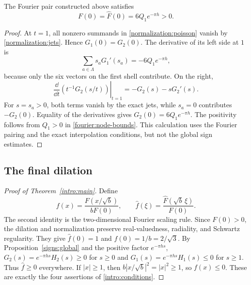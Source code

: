 \begin{lemma}\label{normalization:origin-lemma}
The Fourier pair constructed above satisfies
\begin{equation}\label{normalization:origin}
 F(0)=\widehat F(0)=6Q_1e^{-\pi h}>0.
\end{equation}
\end{lemma}

\begin{proof}
At $t=1$, all nonzero summands in \eqref{normalization:poisson} vanish by
\eqref{normalization:jets}.  Hence $G_1(0)=G_2(0)$.
The derivative of its left side at $1$ is
\[
 \sum_{a\in\Lambda}s_aG_1'(s_a)=-6Q_1e^{-\pi h},
\]
because only the six vectors on the first shell contribute.  On the right,
\[
 \left.\frac{\dd}{\dd t}\left(t^{-1}G_2(s/t)\right)\right|_{t=1}
 =-G_2(s)-sG_2'(s).
\]
For $s=s_a>0$, both terms vanish by the exact jets, while $s_a=0$ contributes
$-G_2(0)$.  Equality of the derivatives gives
$G_2(0)=6Q_1e^{-\pi h}$.  The positivity follows from $Q_1>0$ in
\eqref{fourier:node-bounds}.  This calculation uses the Fourier pairing and
the exact interpolation conditions, but not the global sign estimates.
\end{proof}

\subsection{The final dilation}

\begin{proof}[Proof of Theorem~\ref{intro:main}]
Define
\begin{equation}\label{normalization:scaling}
 f(x)=\frac{F(x/\sqrt b)}{bF(0)},\qquad
 \widehat f(\xi)=\frac{\widehat F(\sqrt b\,\xi)}{F(0)}.
\end{equation}
The second identity is the two-dimensional Fourier scaling rule.  Since
$F(0)>0$, the dilation and normalization preserve real-valuedness,
radiality, and Schwartz regularity.  They give
$\widehat f(0)=1$ and $f(0)=1/b=2/\sqrt3$.
By Proposition~\ref{signs:global} and the positive factor $e^{-\pi hs}$,
$G_2(s)=e^{-\pi hs}H_2(s)\ge0$ for $s\ge0$ and
$G_1(s)=e^{-\pi hs}H_1(s)\le0$ for $s\ge1$.
Thus $\widehat f\ge0$ everywhere.  If $|x|\ge1$,
then $b|x/\sqrt b|^2=|x|^2\ge1$, so $f(x)\le0$.  These are exactly the
four assertions of \eqref{intro:conditions}.
\end{proof}

